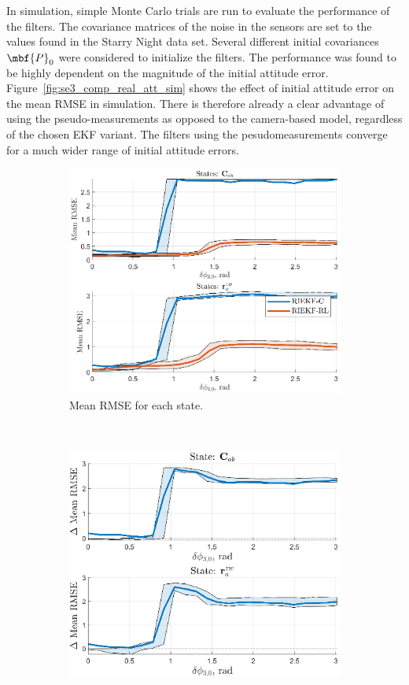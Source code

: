 In simulation, simple Monte Carlo trials are run to evaluate the performance of the filters. The covariance matrices of the noise in the sensors are set to the values found in the Starry Night data set. Several different initial covariances $\mbf{P}_0$ were considered to initialize the filters. The performance was found to be highly dependent on the magnitude of the initial attitude error. Figure~\ref{fig:se3_comp_real_att_sim} shows the effect of initial attitude error on the mean RMSE in simulation. There is therefore already a clear advantage of using the pseudo-measurements as opposed to the camera-based model, regardless of the chosen EKF variant. The filters using the pesudomeasurements converge for a much wider range of initial attitude errors. 
\begin{figure}
	\centering
	\begin{subfigure}[b]{0.5\textwidth}
		\includegraphics[width=\textwidth]{figs/se3/real/comp_att_rmse_state_Att_RL_C.eps}
		\caption{Mean RMSE for each state.}
	\end{subfigure}
	~
	\begin{subfigure}[b]{0.5\textwidth}
		\includegraphics[width=\textwidth]{figs/se3/real/comp_att_diff_state_Att_RL_C.eps}

\end{subfigure}
\end{figure}
